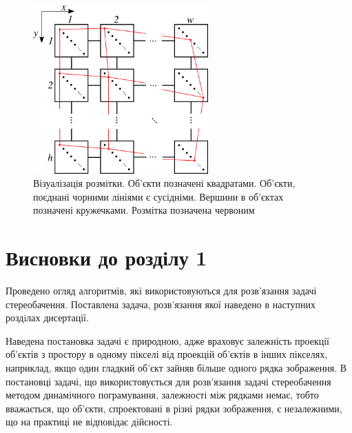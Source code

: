 \begin{figure}[h]
  \centering
  \includegraphics[width=0.6\textwidth]{images/labeling}
  \caption{Візуалізація розмітки.
           Об'єкти позначені квадратами.
           Об'єкти, поєднані чорними лініями є сусідніми.
           Вершини в об'єктах позначені кружечками.
           Розмітка позначена червоним}
  \label{fig:labeling}
\end{figure}

\section*{Висновки до розділу 1}

Проведено огляд алгоритмів,
які використовуються для розв'язання задачі стереобачення.
Поставлена задача,
розв'язання якої наведено в наступних роздiлах дисертації.

Наведена постановка задачі є природною,
адже враховує залежність проекції об'єктів з простору
в одному пікселі від проекцій об'єктів в інших пікселях,
наприклад, якщо один гладкий об'єкт зайняв більше одного рядка зображення.
В постановці задачі,
що використовується для
розв'язання задачі стереобачення методом динамічного пограмування,
залежності між рядками немає, тобто вважається,
що об'єкти, спроектовані в різні рядки зображення, є незалежними,
що на практиці не відповідає дійсності.
